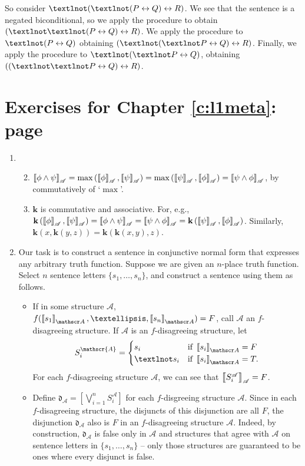 {\begin{enumerate}
So consider $¬(¬(P\bicond Q)\bicond R)$. We see that the sentence is a negated biconditional, so we apply the procedure to obtain $(¬¬(P \bicond Q) \bicond R)$. We apply the procedure to $¬(P\bicond Q)$ obtaining $(¬(¬P \bicond Q)\bicond R)$. Finally, we apply the procedure to $¬(¬P \bicond Q)$, obtaining $((¬¬P \bicond Q) \bicond R)$.

\end{enumerate}

\section*{Exercises for Chapter \ref{c:l1meta}: page \pageref{ex:l1meta}} \label{ans:l1meta}

\begin{enumerate}
\item \begin{enumerate}\setcounter{enumii}{1}
	\item 	$\left\llbracket \phi \wedge \psi\right\rrbracket_{\mathscr{A}} = \max\left(\left\llbracket \phi\right\rrbracket_{\mathscr{A}},\left\llbracket \psi\right\rrbracket_{\mathscr{A}}\right) = \max\left(\left\llbracket \psi\right\rrbracket_{\mathscr{A}},\left\llbracket \phi\right\rrbracket_{\mathscr{A}}\right) = \left\llbracket \psi\wedge \phi\right\rrbracket_{\mathscr{A}}$, by commutatively of `$\max$'. 
	\item $\mathbf{k}$ is commutative and associative. For, e.g., $\mathbf{k}\left(\left\llbracket \phi\right\rrbracket_{\mathscr{A}},\left\llbracket \psi\right\rrbracket_{\mathscr{A}}\right) = \left\llbracket \phi \wedge \psi\right\rrbracket_{\mathscr{A}} = \left\llbracket \psi \wedge \phi\right\rrbracket_{\mathscr{A}} = \mathbf{k}\left(\left\llbracket \psi\right\rrbracket_{\mathscr{A}},\left\llbracket \phi\right\rrbracket_{\mathscr{A}}\right)$. Similarly, $\mathbf{k}(x,\mathbf{k}(y,z)) = \mathbf{k}(\mathbf{k}(x,y),z)$.
\end{enumerate}\setcounter{enumi}{3}
\item Our task is to construct a sentence in conjunctive normal form that expresses any arbitrary truth function. Suppose we are given an $n$-place truth function. Select $n$ sentence letters $\{s_{1},…,s_{n}\}$, and construct a sentence using them as follows. \begin{itemize}
	\item If in some structure $\mathscr{A}$, $f(\val{s_{1}}{A},…,\val{s_{n}}{A}) = F$, call $\mathscr{A}$ an $f$-disagreeing structure. If $\mathscr{A}$ is an $f$-disagreeing structure, let $$S^{\mathscr{A}}_{i} = \begin{cases}
		s_{i} &\text{if } \val{s_{i}}{A} = F\\	
		¬s_{i} &\text{if } \val{s_{i}}{A} = T.
	\end{cases}$$ For each $f$-disagreeing structure $\mathscr{A}$, we can see that $\left\llbracket S_{i}^{\mathscr{A}}\right\rrbracket_{\mathscr{A}} = F$.
	\item Define $\mathfrak{d}_{\mathscr{A}} = \left[\bigvee_{i=1}^{n}S^{\mathscr{A}}_{i}\right]$ for each $f$-disgreeing structure $\mathscr{A}$. Since in each $f$-disagreeing structure, the disjuncts of this disjunction are all $F$, the disjunction $\mathfrak{d}_{\mathscr{A}}$ also is $F$ in an $f$-disagreeing structure $\mathscr{A}$. Indeed, by construction, $\mathfrak{d}_{\mathscr{A}}$ is false only in $\mathscr{A}$ and structures that agree with $\mathscr{A}$ on sentence letters in $\{s_{1},…,s_{n}\}$ – only those structures are guaranteed to be ones where every disjunct is false. 


\end{itemize}
\end{enumerate}}
